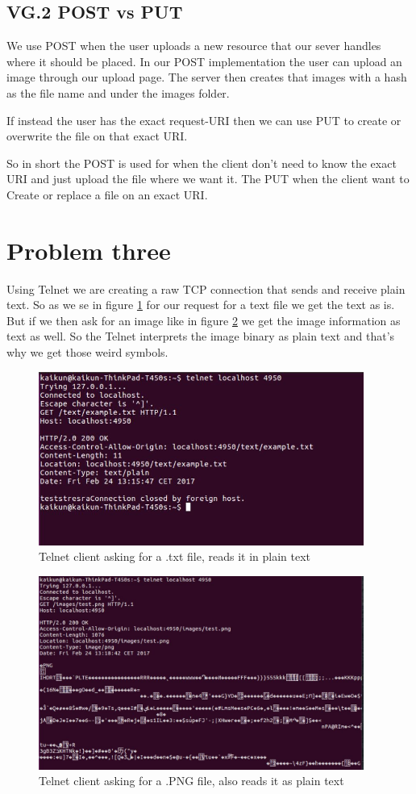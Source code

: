\documentclass[a4paper,12pt]{article}
\numberwithin{figure}{section}
\begin{document}
\newpage
\subsection{VG.2 POST vs PUT}

We use POST when the user uploads a new resource that our sever handles where it should be placed. In our POST implementation the user can upload an image through our upload page. The server then creates that images with a hash as the file name and under the images folder.  

If instead the user has the exact request-URI then we can use PUT to create or overwrite the file on that exact URI. 

So in short the POST is used for when the client don't need to know the exact URI and just upload the file where we want it. The PUT when the client want to Create or replace a file on an exact URI.

\newpage

\section{Problem three}

Using Telnet we are creating a raw TCP connection that sends and receive plain text. So as we se in figure \ref{TEXT} for our request for a text file we get the text as is. But if we then ask for an image like in figure \ref{IMAGE} we get the image information as text as well. So the Telnet interprets the image binary as plain text and that's why we get those weird symbols.

\begin{figure}[h!]
	\centering
	\includegraphics[width=0.95\textwidth,keepaspectratio]{img/TEXT.jpg} 
	\caption{Telnet client asking for a .txt file, reads it in plain text}
	\label{TEXT}
\end{figure}

\begin{figure}[h!]
	\centering
	\includegraphics[width=0.95\textwidth,keepaspectratio]{img/IMAGE.jpg} 
	\caption{Telnet client asking for a .PNG file, also reads it as plain text}
	\label{IMAGE}
\end{figure}
\end{document}
